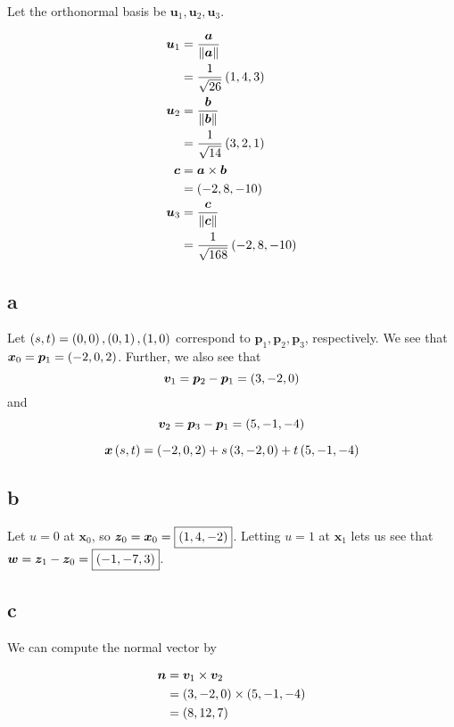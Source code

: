 \documentclass{article}
\begin{document}

Let the orthonormal basis be $\bm{u}_1, \bm{u}_2, \bm{u}_3$.

\begin{align*}
  \bm{u}_1 &= \frac{\bm{a}}{\left\lVert\bm{a}\right\rVert} \\
           &= \frac{1}{\sqrt{26}} \left ( 1, 4, 3 \right) \\
  \bm{u}_2 &= \frac{\bm{b}}{\left\lVert\bm{b}\right\rVert} \\
           &= \frac{1}{\sqrt{14}} \left ( 3, 2, 1 \right) \\
  \bm{c} &= \bm{a} \times \bm{b} \\
           &= \left ( -2, 8, -10 \right) \\
  \bm{u}_3 &= \frac{\bm{c}}{\left\lVert\bm{c}\right\rVert} \\
  &= \frac{1}{\sqrt{168}} \left ( -2, 8, -10 \right) \\
\end{align*}


\subsection*{a}

Let $\left ( s, t \right) = \left ( 0, 0 \right), \left ( 0, 1 \right), \left ( 1, 0 \right)$ correspond to $\bm{p}_1, \bm{p}_2, \bm{p}_3$, respectively.
We see that $\bm{x}_0 = \bm{p}_1 = \left ( -2, 0, 2 \right)$.
Further, we also see that $$\bm{v}_1 = \bm{p}_2 - \bm{p}_1 = \left ( 3, -2, 0 \right)$$ and $$\bm{v}_2 = \bm{p}_3 - \bm{p}_1 = \left ( 5, -1, -4 \right)$$

$$
\bm{x} \left ( s, t \right) = \left ( -2, 0, 2 \right) + s \left ( 3, -2, 0 \right) + t \left ( 5, -1, -4 \right)
$$

\subsection*{b}

Let $u=0$ at $\bm{x}_0$, so $\bm{z}_0 = \bm{x}_0 = \boxed{\left ( 1, 4, -2 \right)}$.
Letting $u=1$ at $\bm{x}_1$ lets us see that $\bm{w} = \bm{z}_1 - \bm{z}_0 = \boxed{\left ( -1, -7, 3 \right)}$.

\subsection*{c}
We can compute the normal vector by

\begin{align*}
  \bm{n} &= \bm{v}_1 \times \bm{v}_2 \\
         &= \left ( 3, -2, 0 \right) \times \left ( 5, -1, -4 \right) \\
         &= \left ( 8, 12, 7 \right) \\
\end{align*}
\end{document}
